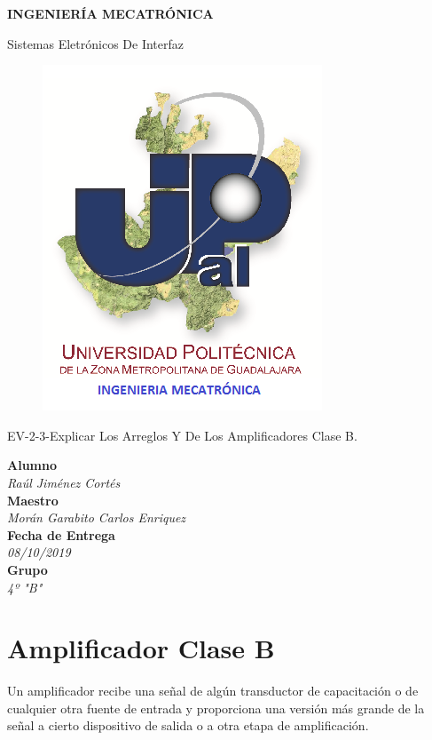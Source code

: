 \documentclass[10pt,a4paper]{article}
\author{Jiménez Cortés Raúl}
\begin{document}
\begin{center}
\begin{LARGE}
\textbf{INGENIERÍA MECATRÓNICA}\\
\end{LARGE}
{\large Sistemas Eletrónicos De Interfaz}\\
\begin{figure}[hbtp]
\centering
\includegraphics[scale=0.80]{UPZMG_Mecatr_nica.png}
\end{figure} 
\begin{center}
\begin{LARGE}
EV-2-3-Explicar Los Arreglos Y De Los Amplificadores Clase B.
\end{LARGE}
\end{center}

\begin{Large}
\textbf{Alumno}
\\\textit{Raúl Jiménez Cortés}
\textbf{\\Maestro}
\\\textit{Morán Garabito Carlos Enriquez}
\textbf{\\Fecha de Entrega}
\\\textit{08/10/2019}
\textbf{\\Grupo}
\\\textit{4º "B"}
\end{Large}
\end{center}

\newpage
\section{Amplificador Clase B}
Un amplificador recibe una señal de algún transductor de capacitación o de cualquier otra fuente de entrada y proporciona una versión más grande de la señal a cierto dispositivo de salida o a otra etapa de amplificación.
\end{document}
